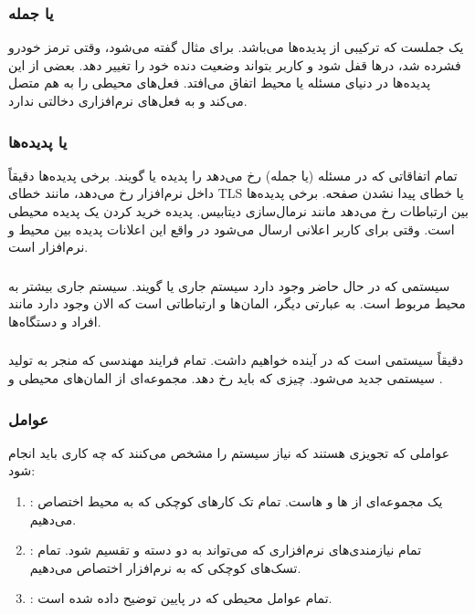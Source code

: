 \subsubsection{ یا جمله}

 یک جملست که ترکیبی از پدیده‌ها می‌باشد. برای مثال گفته می‌شود،
وقتی ترمز خودرو فشرده شد، در‌ها قفل شود و کاربر بتواند وضعیت دنده خود را تغییر
دهد. بعضی از این پدیده‌ها در دنیای مسئله یا محیط اتفاق می‌افتد. فعل‌های محیطی را
به هم متصل می‌کند و به فعل‌های نرم‌افزاری دخالتی ندارد.

\subsubsection{ یا پدیده‌ها}

تمام اتفاقاتی که در مسئله (یا جمله) رخ می‌دهد را پدیده یا  گویند.
برخی پدیده‌ها دقیقاً داخل نرم‌افزار رخ می‌دهد، مانند خطای TLS یا خطای پیدا نشدن
صفحه. برخی پدیده‌ها بین ارتباطات رخ می‌دهد مانند نرمال‌سازی دیتابیس. پدیده خرید
کردن یک پدیده محیطی است. وقتی برای کاربر اعلانی ارسال می‌شود در واقع این اعلانات
پدیده‌ بین محیط و نرم‌افزار است.

\subsubsection{}

سیستمی که در حال حاضر وجود دارد سیستم جاری یا  گویند. سیستم
جاری بیشتر به محیط مربوط است. به عبارتی دیگر، المان‌ها و ارتباطاتی است که الان
وجود دارد مانند افراد و دستگاه‌ها.

\subsubsection{}

 دقیقاً سیستمی است که در آینده خواهیم داشت. تمام فرایند مهندسی
که منجر به تولید سیستمی جدید می‌شود. چیزی که باید رخ دهد. مجموعه‌ای از المان‌های
محیطی و .

\subsubsection{عوامل }

عواملی که تجویزی هستند که نیاز سیستم را مشخص می‌کنند که چه کاری باید انجام شود:

\begin{enumerate}
    \item {}: یک  مجموعه‌ای از
    ها و هاست. تمام تک کار‌های کوچکی که
    به محیط اختصاص می‌دهیم.
    \item {}: تمام نیازمندی‌های نرم‌افزاری که می‌تواند به
    دو دسته  و  تقسیم شود. تمام تسک‌های کوچکی
    که به نرم‌افزار اختصاص می‌دهیم.
    \item {}: تمام عوامل محیطی که در پایین توضیح داده شده است.
\end{enumerate}

